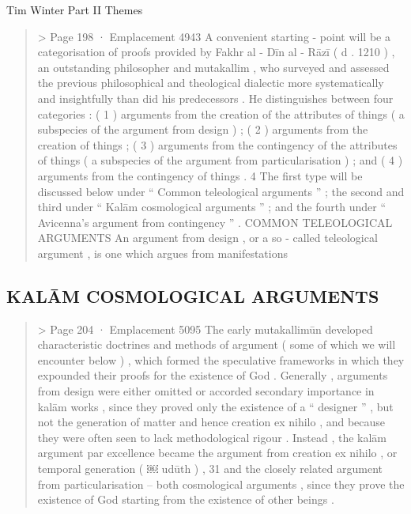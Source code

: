 Tim Winter
Part II Themes
 \begin{quote} > Page 198 · Emplacement 4943
A convenient starting - point will be a categorisation of proofs provided by Fakhr al - Dīn al - Rāzī ( d . 1210 ) , an outstanding philosopher and mutakallim , who surveyed and assessed the previous philosophical and theological dialectic more systematically and insightfully than did his predecessors . He distinguishes between four categories : ( 1 ) arguments from the creation of the attributes of things ( a subspecies of the argument from design ) ; ( 2 ) arguments from the creation of things ; ( 3 ) arguments from the contingency of the attributes of things ( a subspecies of the argument from particularisation ) ; and ( 4 ) arguments from the contingency of things . 4 The first type will be discussed below under “ Common teleological arguments ” ; the second and third under “ Kalām cosmological arguments ” ; and the fourth under “ Avicenna’s argument from contingency ” .
COMMON TELEOLOGICAL ARGUMENTS An argument from design , or a so - called teleological argument , is one which argues from manifestations
\end{quote} 
\subsection{KALĀM COSMOLOGICAL ARGUMENTS}
\begin{quote} > Page 204 · Emplacement 5095
 The early mutakallimūn developed characteristic doctrines and methods of argument ( some of which we will encounter below ) , which formed the speculative frameworks in which they expounded their proofs for the existence of God . Generally , arguments from design were either omitted or accorded secondary importance in kalām works , since they proved only the existence of a “ designer ” , but not the generation of matter and hence creation ex nihilo , and because they were often seen to lack methodological rigour . Instead , the kalām argument par excellence became the argument from creation ex nihilo , or temporal generation ( ￼ udūth ) , 31 and the closely related argument from particularisation – both cosmological arguments , since they prove the existence of God starting from the existence of other beings .
\end{quote} 
